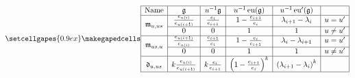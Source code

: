 \documentclass[border={7pt 0pt 7pt 0pt},varwidth]{standalone}
\DeclareMathOperator{\eu}{\operatorname{eu}}
\begin{document}
\begin{table}[ht]
 \[
 \setcellgapes{0.9ex}\makegapedcells
\centering
 \begin{array}{|c|c|c|c|c|c|}
\hline
\text{Name}         & \mathfrak{g}                 & u^{-1}\mathfrak{g}                                           & u^{-1}\eu(\mathfrak{g})                                & u^{-1}\eu'(\mathfrak{g})                                 &           \\ \hline
\multirow{2}{*}{$\mathfrak{m}_{u,us}$} & \frac{e_{u(i)}}{e_{u(i+1)}}  & \frac{e_{i}}{e_{i+1}}  & 1-\frac{e_{i+1}}{e_{i}}                  & \lambda_{i+1}-\lambda_{i}                  & u=u'      \\ \cline{2-6}
                    & 0                            & 0                                                            & 1                                                      & 1                                                        & u \neq u' \\ \hline
\multirow{2}{*}{$\mathfrak{m}_{us,u}$} & \frac{e_{u(i+1)}}{e_{u(i)}}  & \frac{e_{i+1}}{e_{i}}   & 1-\frac{e_{i}}{e_{i+1}}                  & \lambda_{i}-\lambda_{i+1}                  & u=u'      \\ \cline{2-6}
                    & 0                            & 0                                                            & 1                                                      & 1                                                        & u \neq u' \\ \hline
\mathfrak{d}_{u,us} & k\frac{e_{u(i)}}{e_{u(i+1)}} & k\frac{e_{i}}{e_{i+1}} & \left(1-\frac{e_{i+1}}{e_{i}}\right)^{k} & \left(\lambda_{i+1}-\lambda_{i}\right)^{k} &           \\ \hline
 \end{array}
 \]
        
\end{table}
\end{document}
